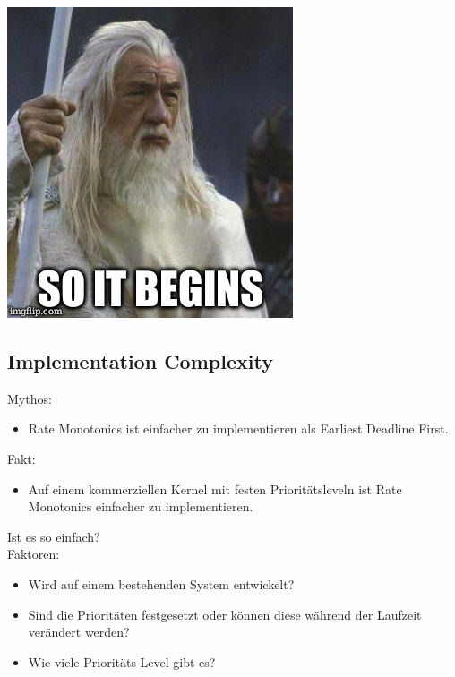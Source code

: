 \begin{frame}{\secname}
	\begin{center}
			\includegraphics[scale=0.5]{graphics/memes/gandalf.jpg}
	\end{center}
\end{frame}

\subsection{Implementation Complexity}\label{ImplementationComplexity}
\begin{frame}{\subsecname}
	Mythos:
	\begin{itemize}
		\item Rate Monotonics ist einfacher zu implementieren als Earliest Deadline First.
	\end{itemize}
\end{frame}

\begin{frame}{\subsecname}
	Fakt:
	\begin{itemize}
		\item Auf einem kommerziellen Kernel mit festen Prioritätsleveln ist Rate Monotonics einfacher zu implementieren.
	\end{itemize}
	Ist es so einfach?\\\pause
	Faktoren:
	\begin{itemize}
		\item Wird auf einem bestehenden System entwickelt?
		\item Sind die Prioritäten festgesetzt oder können diese während der Laufzeit verändert werden?
		\item Wie viele Prioritäts-Level gibt es?
	\end{itemize}
\end{frame}

